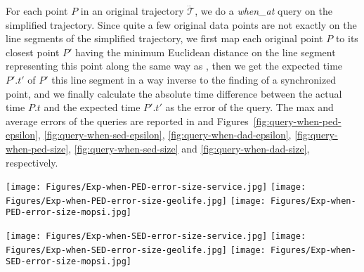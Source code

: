 {
{For each point $P$ in an original trajectory $\dddot{\mathcal{T}}$, we do a \emph{when\_at} query on the simplified trajectory. Since quite a few original data points are not exactly on the line segments of the simplified trajectory, we first map each original point $P$ to its closest point $P'$ having the minimum Euclidean distance on the line segment representing this point along the same way as \cite{Cao:Spatio}, then we get the expected time $P'.t'$ of $P'$ \wrt this line segment in a way inverse to the finding of a synchronized point, and we finally calculate the absolute time difference between the actual time $P.t$ and the expected time $P'.t'$ as the error of the query.}
%
{The max and average errors of the queries are reported in  and Figures~\ref{fig:query-when-ped-epsilon}, \ref{fig:query-when-sed-epsilon}, \ref{fig:query-when-dad-epsilon}, \ref{fig:query-when-ped-size}, \ref{fig:query-when-sed-size} and \ref{fig:query-when-dad-size}, respectively.}








\begin{figure*}[tb!]
	\centering
	\texttt{[image: Figures/Exp-when-PED-error-size-service.jpg]} 	\hspace{0.5ex}
	\texttt{[image: Figures/Exp-when-PED-error-size-geolife.jpg]}	\hspace{0.5ex}
	\texttt{[image: Figures/Exp-when-PED-error-size-mopsi.jpg]}		
	\vspace{-2ex}
	\caption{\small {Evaluation of \emph{when\_at} queries (\ped) on small datasets: varying the size of
		trajectories.}}
	\label{fig:query-when-ped-size}
	\vspace{-1ex}
\end{figure*}

\begin{figure*}[tb!]
	\centering
	\texttt{[image: Figures/Exp-when-SED-error-size-service.jpg]} 	\hspace{0.5ex}
	\texttt{[image: Figures/Exp-when-SED-error-size-geolife.jpg]}	\hspace{0.5ex}
	\texttt{[image: Figures/Exp-when-SED-error-size-mopsi.jpg]}		
	\vspace{-2ex}
	\caption{\small {Evaluation of \emph{when\_at} queries (\sed) on small datasets: varying the size of
		trajectories.}}
	\label{fig:query-when-sed-size}
	\vspace{-1ex}
\end{figure*}


}
